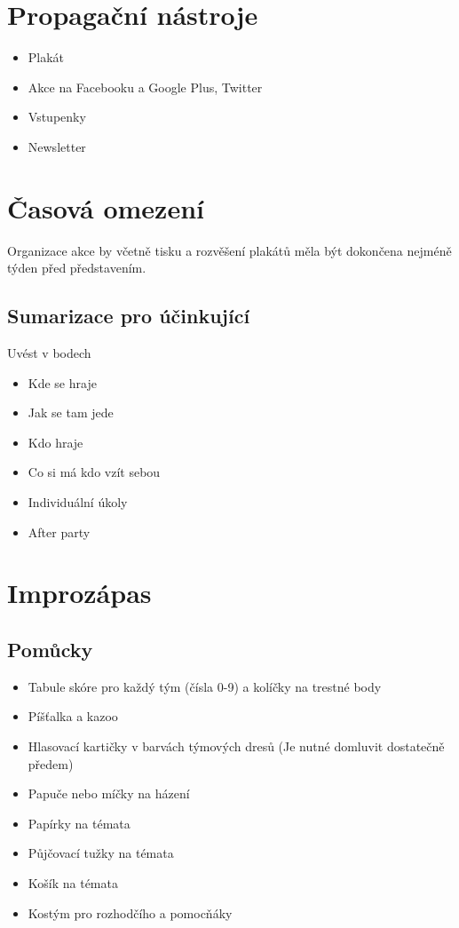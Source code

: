 \section{Propagační nástroje} \begin{itemize}
\item Plakát
\item Akce na Facebooku a Google Plus, Twitter
\item Vstupenky
\item Newsletter
\end{itemize}
 
\section{Časová omezení} Organizace akce by včetně tisku a rozvěšení plakátů měla být dokončena nejméně týden před představením. 
\subsection{Sumarizace pro účinkující} Uvést v bodech 
\begin{itemize}
\item Kde se hraje
\item Jak se tam jede
\item Kdo hraje
\item Co si má kdo vzít sebou
\item Individuální úkoly
\item After party
\end{itemize}
\section{Improzápas} \subsection{Pomůcky} \begin{itemize}
\item Tabule skóre pro každý tým (čísla 0-9) a kolíčky na trestné body
\item Píšťalka a kazoo
\item Hlasovací kartičky v barvách týmových dresů (Je nutné domluvit dostatečně předem)
\item Papuče nebo míčky na házení
\item Papírky na témata
\item Půjčovací tužky na témata
\item Košík na témata
\item Kostým pro rozhodčího a pomocňáky
\end{itemize}
